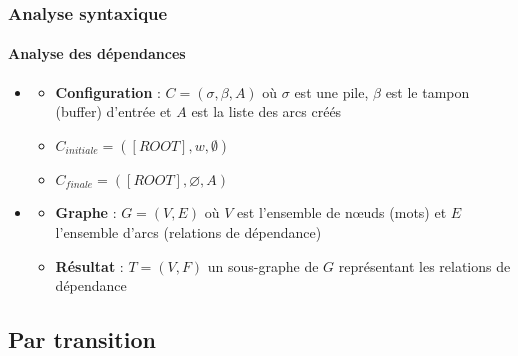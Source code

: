 \documentclass[xcolor=table]{beamer}
\begin{document}
\begin{frame}
\frametitle{Analyse syntaxique}
\framesubtitle{Analyse des dépendances}

\begin{minipage}{.6\textwidth}
\begin{itemize}
	\item {} 
	\begin{itemize}
		\item \textbf{Configuration} :  $C = (\sigma, \beta, A)$ où $\sigma$ est une pile, $\beta$ est le tampon (buffer) d'entrée et $A$ est la liste des arcs créés
		\item $C_{initiale} = ([ROOT], w, \emptyset)$
		\item $C_{finale} = ([ROOT], \varnothing, A)$
	\end{itemize}
\end{itemize}
\end{minipage}
\begin{minipage}{.38\textwidth}
\end{minipage}

%
\vfill

\begin{minipage}{.6\textwidth}
	\begin{itemize}
		\item {}
		\begin{itemize}
			\item \textbf{Graphe} : $G = (V, E)$ où $V$ est l'ensemble de nœuds (mots) et $E$ l'ensemble d'arcs (relations de dépendance)
			\item \textbf{Résultat} : $T = (V, F)$ un sous-graphe de $G$ représentant les relations de dépendance
		\end{itemize}
	\end{itemize}
\end{minipage}
\begin{minipage}{.38\textwidth}
\end{minipage}

\end{frame}

\subsection{Par transition}
\end{document}
